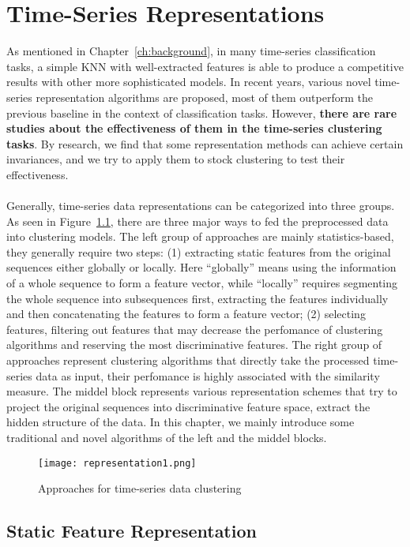\chapter{Time-Series Representations}
\label{cha:representation}
As mentioned in Chapter~\ref{ch:background}, in many time-series classification tasks, a simple KNN with well-extracted features is able to produce a competitive results with other more sophisticated models. In recent years, various novel time-series representation algorithms are proposed, most of them outperform the previous baseline in the context of classification tasks. However, \textbf{there are rare studies about the effectiveness of them in the time-series clustering tasks}. By research, we find that some representation methods can achieve certain invariances, and we try to apply them to stock clustering to test their effectiveness.\\
\\Generally, time-series data representations can be categorized into three groups. As seen in Figure~\ref{fig:representation1}, there are three major ways to fed the preprocessed data into clustering models. The left group of approaches are mainly statistics-based, they generally require two steps: (1) extracting static features from the original sequences either globally or locally. Here ``globally'' means using the information of a whole sequence to form a feature vector, while ``locally'' requires segmenting the whole sequence into subsequences first, extracting the features individually and then concatenating the features to form a feature vector; (2) selecting features, filtering out features that may decrease the perfomance of clustering algorithms and reserving the most discriminative features. The right group of approaches represent clustering algorithms that directly take the processed time-series data as input, their perfomance is highly associated with the similarity measure. The middel block represents various representation schemes that try to project the original sequences into discriminative feature space, extract the hidden structure of the data. In this chapter, we mainly introduce some traditional and novel algorithms of the left and the middel blocks.
\begin{figure}[!htbp]
    \centering
    \texttt{[image: representation1.png]}
    \caption{Approaches for time-series data clustering}
    \label{fig:representation1}
\end{figure} 

\section{Static Feature Representation}

